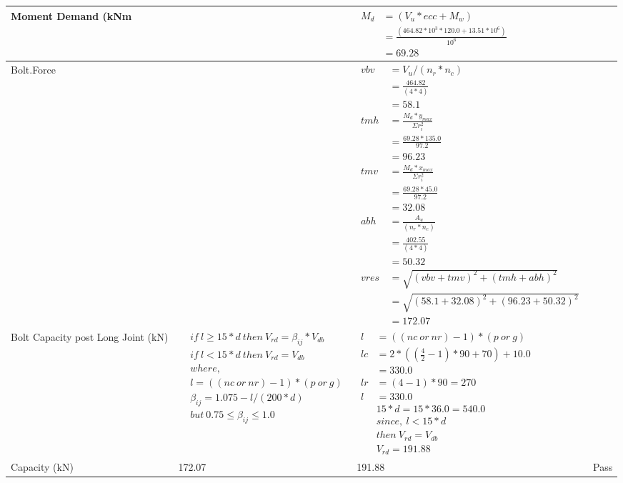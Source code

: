 \documentclass{article}%
\begin{document}
\begin{longtable}{|p{4cm}|p{5cm}|p{5.5cm}|p{1.5cm}|}
\hline%
Moment Demand (kNm&&$\begin{aligned}  M_d &= (V_u * ecc + M_w)\\  &= \frac{(464.82 * 10^3 *120.0 + 13.51*10^6)}{10^6}\\  & =69.28\end{aligned}$&\\%
\hline%
Bolt.Force&&$\begin{aligned} vbv~~ &= V_u / (n_r * n_c)\\  &= \frac{464.82}{ (4*4)}\\  & =58.1\\ tmh~ &= \frac{M_d * y_{max} }{ \Sigma r_i^2} \\  &= \frac{69.28 *135.0}{97.2}\\  & =96.23\\  tmv ~&= \frac{M_d * x_{max}}{\Sigma r_i^2}\\ &= \frac{69.28 * 45.0}{97.2}\\  & =32.08\\  abh~ & = \frac{A_u }{(n_r * n_c)}\\   & =\frac{402.55}{ (4 *4)}\\  & =50.32\\  vres &=\sqrt{(vbv +tmv) ^ 2 + (tmh+abh) ^ 2}\\   &= \sqrt{(58.1 +32.08) ^2 + (96.23+50.32) ^ 2}\\  & =172.07\end{aligned}$&\\%
\hline%
Bolt Capacity post Long Joint (kN)&$\begin{aligned} &if~l\geq 15 * d~then~V_{rd} = \beta_{ij} * V_{db} \\ & if~l < 15 * d~then~V_{rd} = V_{db} \\ & where,\\ & l = ((nc~or~nr) - 1) * (p~or~g) \\ & \beta_{ij} = 1.075 - l/(200 * d) \\ & but~0.75\leq\beta_{ij}\leq1.0 \end{aligned}$&$\begin{aligned} l&= ((nc~or~nr) - 1) * (p~or~g) \\  lc&= 2*((\frac{4}{2} - 1) * 90+70)+ 10.0\\&=330.0\\  lr&= (4 - 1) * 90=270\\  l&= 330.0\\ & 15 * d = 15 * 36.0 = 540.0 \\ & since,~l < 15 * d~\\&then~V_{rd} = V_{db} \\ & V_{rd} = 191.88 \end{aligned}$&\\%
\hline%
Capacity (kN)&172.07&191.88&Pass\\%
\hline%
\end{longtable}
\end{document}
